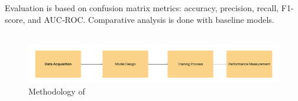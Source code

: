 Evaluation is based on confusion matrix metrics: accuracy, precision, recall, F1-score, and AUC-ROC.
Comparative analysis is done with baseline models.\\\\

\begin{figure}[H]
    \centering
    \includegraphics[width=1\textwidth]{img/model 1.png}
    \caption{Methodology of \cite{8667113}}
    \label{fig:Methodology of paper 1}
\end{figure}

